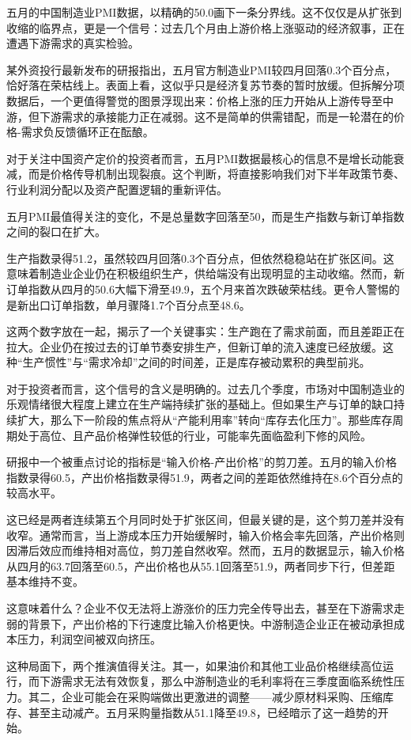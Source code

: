 \documentclass[11pt]{ctexart}
\begin{document}
五月的中国制造业PMI数据，以精确的50.0画下一条分界线。这不仅仅是从扩张到收缩的临界点，更是一个信号：过去几个月由上游价格上涨驱动的经济叙事，正在遭遇下游需求的真实检验。

某外资投行最新发布的研报指出，五月官方制造业PMI较四月回落0.3个百分点，恰好落在荣枯线上。表面上看，这似乎只是经济复苏节奏的暂时放缓。但拆解分项数据后，一个更值得警觉的图景浮现出来：价格上涨的压力开始从上游传导至中游，但下游需求的承接能力正在减弱。这不是简单的供需错配，而是一轮潜在的价格-需求负反馈循环正在酝酿。

对于关注中国资产定价的投资者而言，五月PMI数据最核心的信息不是增长动能衰减，而是价格传导机制出现裂痕。这个判断，将直接影响我们对下半年政策节奏、行业利润分配以及资产配置逻辑的重新评估。

五月PMI最值得关注的变化，不是总量数字回落至50，而是生产指数与新订单指数之间的裂口在扩大。

生产指数录得51.2，虽然较四月回落0.3个百分点，但依然稳稳站在扩张区间。这意味着制造业企业仍在积极组织生产，供给端没有出现明显的主动收缩。然而，新订单指数从四月的50.6大幅下滑至49.9，五个月来首次跌破荣枯线。更令人警惕的是新出口订单指数，单月骤降1.7个百分点至48.6。

这两个数字放在一起，揭示了一个关键事实：生产跑在了需求前面，而且差距正在拉大。企业仍在按过去的订单节奏安排生产，但新订单的流入速度已经放缓。这种“生产惯性”与“需求冷却”之间的时间差，正是库存被动累积的典型前兆。

对于投资者而言，这个信号的含义是明确的。过去几个季度，市场对中国制造业的乐观情绪很大程度上建立在生产端持续扩张的基础上。但如果生产与订单的缺口持续扩大，那么下一阶段的焦点将从“产能利用率”转向“库存去化压力”。那些库存周期处于高位、且产品价格弹性较低的行业，可能率先面临盈利下修的风险。

研报中一个被重点讨论的指标是“输入价格-产出价格”的剪刀差。五月的输入价格指数录得60.5，产出价格指数录得51.9，两者之间的差距依然维持在8.6个百分点的较高水平。

这已经是两者连续第五个月同时处于扩张区间，但最关键的是，这个剪刀差并没有收窄。通常而言，当上游成本压力开始缓解时，输入价格会率先回落，产出价格则因滞后效应而维持相对高位，剪刀差自然收窄。然而，五月的数据显示，输入价格从四月的63.7回落至60.5，产出价格也从55.1回落至51.9，两者同步下行，但差距基本维持不变。

这意味着什么？企业不仅无法将上游涨价的压力完全传导出去，甚至在下游需求走弱的背景下，产出价格的下行速度比输入价格更快。中游制造企业正在被动承担成本压力，利润空间被双向挤压。

这种局面下，两个推演值得关注。其一，如果油价和其他工业品价格继续高位运行，而下游需求无法有效恢复，那么中游制造业的毛利率将在三季度面临系统性压力。其二，企业可能会在采购端做出更激进的调整——减少原材料采购、压缩库存、甚至主动减产。五月采购量指数从51.1降至49.8，已经暗示了这一趋势的开始。
\end{document}
